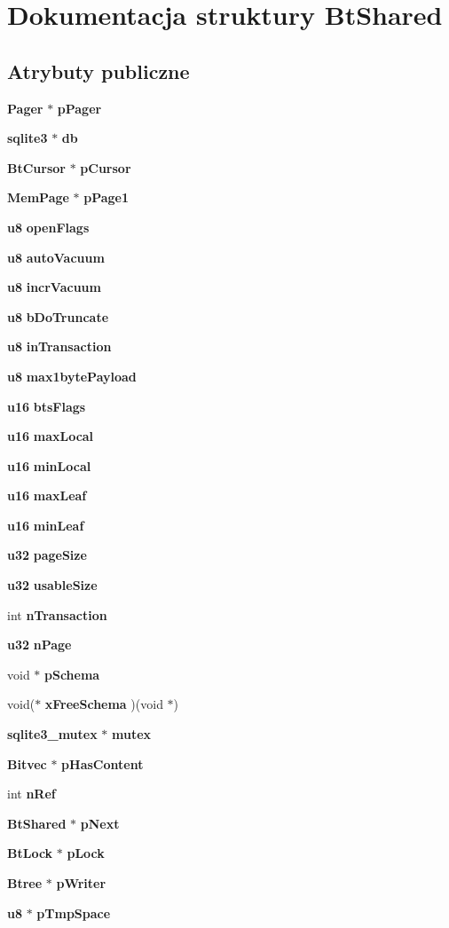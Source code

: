 \section{Dokumentacja struktury Bt\+Shared}
\label{struct_bt_shared}
\subsection*{Atrybuty publiczne}
\begin{DoxyCompactItemize}
\item 
\textbf{ Pager} $\ast$ \textbf{ p\+Pager}
\item 
\textbf{ sqlite3} $\ast$ \textbf{ db}
\item 
\textbf{ Bt\+Cursor} $\ast$ \textbf{ p\+Cursor}
\item 
\textbf{ Mem\+Page} $\ast$ \textbf{ p\+Page1}
\item 
\textbf{ u8} \textbf{ open\+Flags}
\item 
\textbf{ u8} \textbf{ auto\+Vacuum}
\item 
\textbf{ u8} \textbf{ incr\+Vacuum}
\item 
\textbf{ u8} \textbf{ b\+Do\+Truncate}
\item 
\textbf{ u8} \textbf{ in\+Transaction}
\item 
\textbf{ u8} \textbf{ max1byte\+Payload}
\item 
\textbf{ u16} \textbf{ bts\+Flags}
\item 
\textbf{ u16} \textbf{ max\+Local}
\item 
\textbf{ u16} \textbf{ min\+Local}
\item 
\textbf{ u16} \textbf{ max\+Leaf}
\item 
\textbf{ u16} \textbf{ min\+Leaf}
\item 
\textbf{ u32} \textbf{ page\+Size}
\item 
\textbf{ u32} \textbf{ usable\+Size}
\item 
int \textbf{ n\+Transaction}
\item 
\textbf{ u32} \textbf{ n\+Page}
\item 
void $\ast$ \textbf{ p\+Schema}
\item 
void($\ast$ \textbf{ x\+Free\+Schema} )(void $\ast$)
\item 
\textbf{ sqlite3\+\_\+mutex} $\ast$ \textbf{ mutex}
\item 
\textbf{ Bitvec} $\ast$ \textbf{ p\+Has\+Content}
\item 
int \textbf{ n\+Ref}
\item 
\textbf{ Bt\+Shared} $\ast$ \textbf{ p\+Next}
\item 
\textbf{ Bt\+Lock} $\ast$ \textbf{ p\+Lock}
\item 
\textbf{ Btree} $\ast$ \textbf{ p\+Writer}
\item 
\textbf{ u8} $\ast$ \textbf{ p\+Tmp\+Space}
\end{DoxyCompactItemize}


